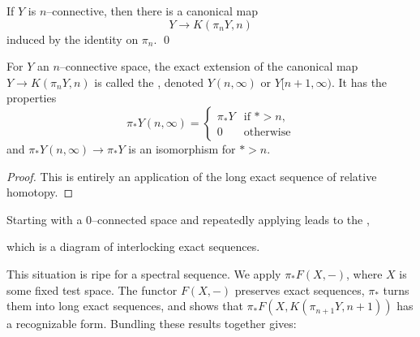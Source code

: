 \begin{corollary}
If $Y$ is $n$--connective, then there is a canonical map \[Y \to K(\pi_n Y, n)\] induced by the identity on $\pi_n$. \qed
\end{corollary}

\begin{corollary}\label{PostnikovTruncationsExist}
For $Y$ an $n$--connective space, the exact extension of the canonical map $Y \to K(\pi_n Y, n)$ is called the , denoted $Y(n, \infty)$ or $Y[n+1, \infty)$.
It has the properties \[\pi_* Y(n, \infty) = \begin{cases} \pi_* Y & \text{if $* > n$}, \\ 0 & \text{otherwise} \end{cases}\] and $\pi_* Y(n, \infty) \to \pi_* Y$ is an isomorphism for $* > n$.
\end{corollary}
\begin{proof}
This is entirely an application of the long exact sequence of relative homotopy.
\end{proof}

\begin{definition}
Starting with a $0$--connected space and repeatedly applying  leads to the ,

\begin{figure*}[h]
\begin{center}
\end{center}
\end{figure*}

which is a diagram of interlocking exact sequences.
\end{definition}

This situation is ripe for a spectral sequence.
We apply $\pi_* F(X, -)$, where $X$ is some fixed test space.  The functor $F(X, -)$ preserves exact sequences, $\pi_*$ turns them into long exact sequences, and  shows that $\pi_* F(X, K(\pi_{n+1} Y, n+1))$ has a recognizable form.
Bundling these results together gives:

